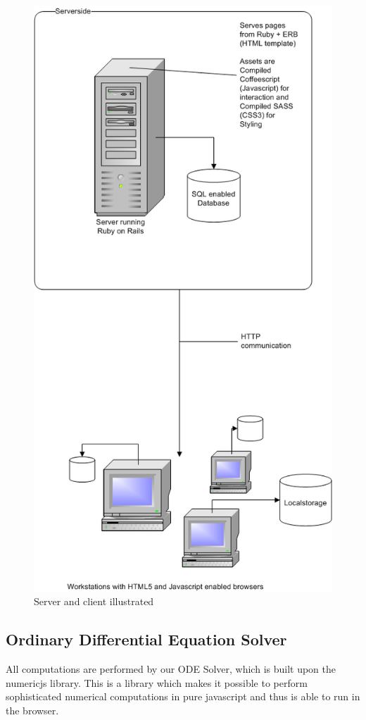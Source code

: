 \documentclass{report}
\begin{document}
			\begin{figure}
			\centering
				\includegraphics[scale=0.8]{EAD.png}
			\caption{Server and client illustrated}
			\label{fig:csillustration}
			\end{figure}
\clearpage
		\subsection{Ordinary Differential Equation Solver}
			All computations are performed by our ODE Solver, which is built upon the numericjs library. This is a library which makes it possible to perform sophisticated numerical computations in pure javascript and thus is able to run in the browser.
\end{document}
